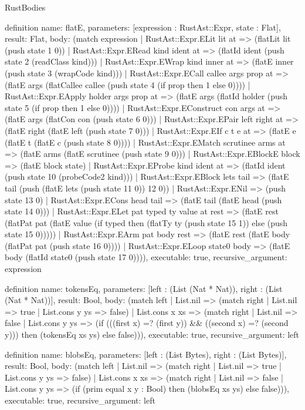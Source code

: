 \begin{lexlean}{RustBodies}
\begin{semanticmodule}
definition{
  name: flatE,
  parameters: [expression : RustAst::Expr, state : Flat],
  result: Flat,
  body: (match expression
    | RustAst::Expr.ELit lit at => (flatLit lit (push state 1 0))
    | RustAst::Expr.ERead kind ident at => (flatId ident (push state 2 (readClass kind)))
    | RustAst::Expr.EWrap kind inner at => (flatE inner (push state 3 (wrapCode kind)))
    | RustAst::Expr.ECall callee args prop at => (flatE args (flatCallee callee (push state 4 (if prop then 1 else 0))))
    | RustAst::Expr.EApply holder args prop at => (flatE args (flatId holder (push state 5 (if prop then 1 else 0))))
    | RustAst::Expr.EConstruct con args at => (flatE args (flatCon con (push state 6 0)))
    | RustAst::Expr.EPair left right at => (flatE right (flatE left (push state 7 0)))
    | RustAst::Expr.EIf c t e at => (flatE e (flatE t (flatE c (push state 8 0))))
    | RustAst::Expr.EMatch scrutinee arms at => (flatE arms (flatE scrutinee (push state 9 0)))
    | RustAst::Expr.EBlockE block => (flatE block state)
    | RustAst::Expr.EProbe kind ident at => (flatId ident (push state 10 (probeCode2 kind)))
    | RustAst::Expr.EBlock lets tail => (flatE tail (push (flatE lets (push state 11 0)) 12 0))
    | RustAst::Expr.ENil => (push state 13 0)
    | RustAst::Expr.ECons head tail => (flatE tail (flatE head (push state 14 0)))
    | RustAst::Expr.ELet pat typed ty value at rest => (flatE rest (flatPat pat (flatE value (if typed then (flatTy ty (push state 15 1)) else (push state 15 0)))))
    | RustAst::Expr.EArm pat body rest => (flatE rest (flatE body (flatPat pat (push state 16 0))))
    | RustAst::Expr.ELoop state0 body => (flatE body (flatId state0 (push state 17 0)))),
  executable: true,
  recursive_argument: expression
}

definition{
  name: tokensEq,
  parameters: [left : (List (Nat * Nat)), right : (List (Nat * Nat))],
  result: Bool,
  body: (match left
    | List.nil => (match right | List.nil => true | List.cons y ys => false)
    | List.cons x xs => (match right
      | List.nil => false
      | List.cons y ys => (if (((first x) =? (first y)) && ((second x) =? (second y))) then (tokensEq xs ys) else false))),
  executable: true,
  recursive_argument: left
}

definition{
  name: blobsEq,
  parameters: [left : (List Bytes), right : (List Bytes)],
  result: Bool,
  body: (match left
    | List.nil => (match right | List.nil => true | List.cons y ys => false)
    | List.cons x xs => (match right
      | List.nil => false
      | List.cons y ys => (if (prim equal x y : Bool) then (blobsEq xs ys) else false))),
  executable: true,
  recursive_argument: left
}


\end{semanticmodule}
\end{lexlean}
